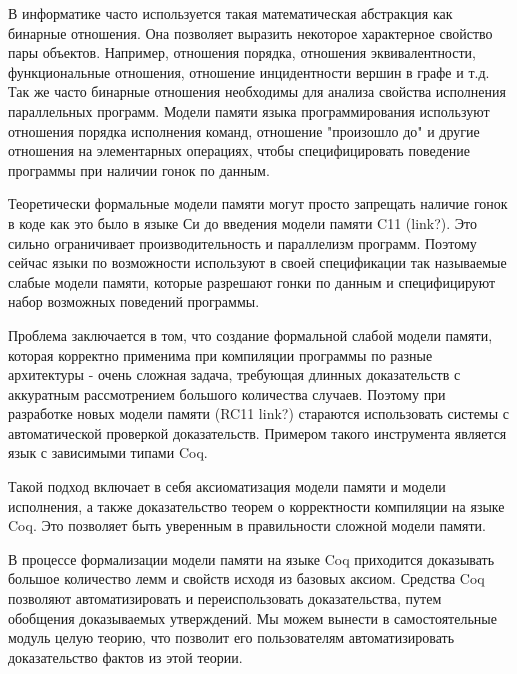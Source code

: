 \documentclass[times
              ]{itmo-student-thesis}
\begin{document}

\tableofcontents

\startprefacepage


 В информатике часто используется такая математическая абстракция как бинарные отношения.
Она позволяет выразить некоторое характерное свойство пары объектов. Например, отношения порядка, отношения эквивалентности, функциональные отношения, отношение инцидентности вершин в графе и т.д.
Так же часто бинарные отношения необходимы для анализа свойства исполнения параллельных программ. Модели памяти языка программирования используют отношения порядка исполнения команд, отношение "произошло до" и другие отношения на элементарных операциях, чтобы специфицировать поведение программы при наличии гонок по данным.

Теоретически формальные модели памяти могут просто запрещать наличие гонок в коде как это было в языке Си до введения модели памяти C11 (link?). Это сильно ограничивает производительность и параллелизм программ. Поэтому сейчас языки по возможности используют в своей спецификации так называемые слабые модели памяти, которые разрешают гонки по данным и специфицируют набор возможных поведений программы.

Проблема заключается в том, что создание формальной слабой модели памяти, которая корректно применима при компиляции программы по разные архитектуры - очень сложная задача, требующая длинных доказательств с аккуратным рассмотрением большого количества случаев.
Поэтому при разработке новых модели памяти (RC11 link?) стараются использовать системы с автоматической проверкой доказательств. Примером такого инструмента является язык с зависимыми типами Coq.

Такой подход включает в себя аксиоматизация модели памяти и модели исполнения, а
также доказательство теорем о корректности компиляции на языке Coq. Это позволяет быть уверенным в правильности сложной модели памяти.

В процессе формализации модели памяти на языке Coq приходится доказывать большое количество лемм и свойств исходя из базовых аксиом. Средства Coq позволяют автоматизировать и переиспользовать доказательства, путем обобщения доказываемых утверждений. Мы можем вынести в самостоятельные модуль целую теорию, что позволит его пользователям автоматизировать доказательство фактов из этой теории.
\end{document}
